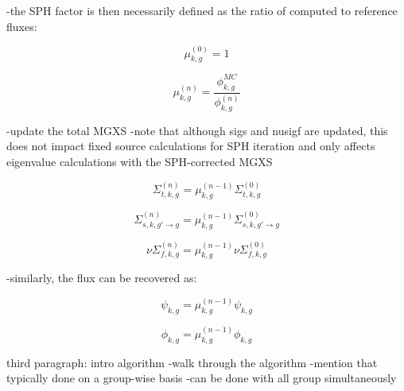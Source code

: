 -the SPH factor is then necessarily defined as the ratio of computed to reference fluxes:

\begin{dmath}
\label{eqn:chap6-sph-initial}
\mu_{k,g}^{(0)} = 1
\end{dmath}

\begin{equation}
\label{eqn:chap6-sph-update}
\mu_{k,g}^{(n)} = \frac{\phi_{k,g}^{MC}}{\phi_{k,g}^{(n)}}
\end{equation}


-update the total MGXS
-note that although sigs and nusigf are updated, this does not impact fixed source calculations for SPH iteration and only affects eigenvalue calculations with the SPH-corrected MGXS

\begin{dmath}
\label{eqn:chap6-sph-update-sigt}
\Sigma_{t,k,g}^{(n)} = \mu_{k,g}^{(n-1)}\Sigma_{t,k,g}^{(0)}
\end{dmath}

\begin{dmath}
\label{eqn:chap6-sph-update-sigs}
\Sigma_{s,k,g'\rightarrow g}^{(n)} = \mu_{k,g}^{(n-1)}\Sigma_{s,k,g'\rightarrow g}^{(0)}
\end{dmath}

\begin{dmath}
\label{eqn:chap6-sph-update-nusigf}
\nu\Sigma_{f,k,g}^{(n)} = \mu_{k,g}^{(n-1)}\nu\Sigma_{f,k,g}^{(0)}
\end{dmath}

-similarly, the flux can be recovered as:

\begin{dmath}
\label{eqn:chap6-sph-update-angular-flux}
\psi_{k,g} = \mu_{k,g}^{(n-1)}\psi_{k,g}
\end{dmath}

\begin{dmath}
\label{eqn:chap6-sph-update-scalar-flux}
\phi_{k,g} = \mu_{k,g}^{(n-1)}\phi_{k,g}
\end{dmath}

third paragraph: intro algorithm
-walk through the algorithm
-mention that typically done on a group-wise basis
-can be done with all group simultaneously

